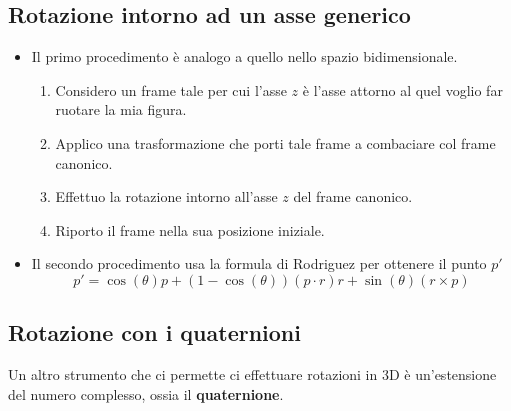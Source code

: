 \subsection{Rotazione intorno ad un asse generico}
\begin{itemize}
	\item Il primo procedimento \`e analogo a quello nello spazio bidimensionale.
	      \begin{enumerate}
		      \item Considero un frame tale per cui l'asse $z$ \`e l'asse attorno al quel
		            voglio far ruotare la mia figura.
		      \item Applico una trasformazione che porti tale frame a combaciare col frame
		            canonico.
		      \item Effettuo la rotazione intorno all'asse $z$ del frame canonico.
		      \item Riporto il frame nella sua posizione iniziale.
	      \end{enumerate}
	\item Il secondo procedimento usa la formula di Rodriguez per ottenere il punto $p'$
	      \[ p' = \cos(\theta) p + (1 - \cos(\theta))(p \cdot r) r + \sin(\theta)(r \times p) \]
\end{itemize}

\subsection{Rotazione con i quaternioni}
Un altro strumento che ci permette ci effettuare rotazioni in 3D \`e un'estensione del numero
complesso, ossia il \textbf{quaternione}.
